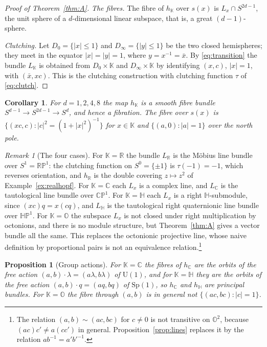 \documentclass[11pt]{amsart}
\numberwithin{equation}{section}
\theoremstyle{plain}
\newtheorem{proposition}[theorem]{Proposition}
\newtheorem{corollary}[theorem]{Corollary}
\theoremstyle{definition}
\theoremstyle{remark}
\newtheorem{remark}[theorem]{Remark}
\newcommand{\R}{\mathbb{R}}
\newcommand{\C}{\mathbb{C}}
\newcommand{\Hq}{\mathbb{H}}
\newcommand{\Oc}{\mathbb{O}}
\newcommand{\K}{\mathbb{K}}
\newcommand{\Sp}{\mathrm{Sp}}
\newcommand{\U}{\mathrm{U}}
\newcommand{\RP}{\mathbb{RP}}
\newcommand{\CP}{\mathbb{CP}}
\newcommand{\HP}{\mathbb{HP}}
\begin{document}
\begin{proof}[Proof of Theorem~\ref{thm:A}]
\emph{The fibres.} The fibre of $h_\K$ over $s(x)$ is $L_x\cap S^{2d-1}$, the unit sphere of a $d$-dimensional linear subspace, that is, a great $(d-1)$-sphere.

\emph{Clutching.} Let $D_0=\{|x|\le1\}$ and $D_\infty=\{|y|\le1\}$ be the two closed hemispheres; they meet in the equator $|x|=|y|=1$, where $y=x^{-1}=\bar x$. By \eqref{eq:transition} the bundle $L_\K$ is obtained from $D_0\times\K$ and $D_\infty\times\K$ by identifying $(x,c)$, $|x|=1$, with $(\bar x,xc)$. This is the clutching construction with clutching function $\tau$ of \eqref{eq:clutch}.
\end{proof}

\begin{corollary}\label{cor:fibration}
For $d=1,2,4,8$ the map $h_\K$ is a smooth fibre bundle $S^{d-1}\to S^{2d-1}\to S^d$, and hence a fibration. The fibre over $s(x)$ is $\{(xc,c):|c|^2=(1+|x|^2)^{-1}\}$ for $x\in\K$ and $\{(a,0):|a|=1\}$ over the north pole.
\end{corollary}

\begin{remark}[The four cases]\label{rem:fourcases}
For $\K=\R$ the bundle $L_\R$ is the M\"obius line bundle over $S^1=\RP^1$: the clutching function on $S^0=\{\pm1\}$ is $\tau(-1)=-1$, which reverses orientation, and $h_\R$ is the double covering $z\mapsto z^2$ of Example~\ref{ex:realhopf}. For $\K=\C$ each $L_x$ is a complex line, and $L_\C$ is the tautological line bundle over $\CP^1$. For $\K=\Hq$ each $L_x$ is a right $\Hq$-submodule, since $(xc)q=x(cq)$, and $L_\Hq$ is the tautological right quaternionic line bundle over $\HP^1$. For $\K=\Oc$ the subspace $L_x$ is not closed under right multiplication by octonions, and there is no module structure, but Theorem~\ref{thm:A} gives a vector bundle all the same. This replaces the octonionic projective line, whose naive definition by proportional pairs is not an equivalence relation.\footnote{The relation $(a,b)\sim(ac,bc)$ for $c\neq0$ is not transitive on $\Oc^2$, because $(ac)c'\neq a(cc')$ in general. Proposition~\ref{prop:lines} replaces it by the relation $ab^{-1}=a'b'^{-1}$.}
\end{remark}

\begin{proposition}[Group actions]\label{prop:actions}
For $\K=\C$ the fibres of $h_\C$ are the orbits of the free action $(a,b)\cdot\lambda=(a\lambda,b\lambda)$ of $\U(1)$, and for $\K=\Hq$ they are the orbits of the free action $(a,b)\cdot q=(aq,bq)$ of $\Sp(1)$, so $h_\C$ and $h_\Hq$ are principal bundles. For $\K=\Oc$ the fibre through $(a,b)$ is in general not $\{(ac,bc):|c|=1\}$.
\end{proposition}
\end{document}
